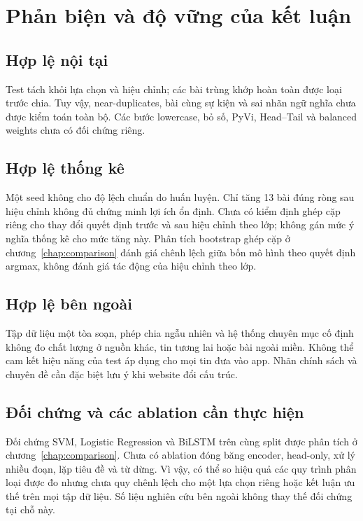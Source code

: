 \section{Phản biện và độ vững của kết luận}
\subsection{Hợp lệ nội tại}
Test tách khỏi lựa chọn và hiệu chỉnh; các bài trùng khớp hoàn toàn được loại trước chia. Tuy vậy, near-duplicates, bài cùng sự kiện và sai nhãn ngữ nghĩa chưa được kiểm toán toàn bộ. Các bước lowercase, bỏ số, PyVi, Head--Tail và balanced weights chưa có đối chứng riêng.
\subsection{Hợp lệ thống kê}
Một seed không cho độ lệch chuẩn do huấn luyện. Chỉ tăng 13 bài đúng ròng sau hiệu chỉnh không đủ chứng minh lợi ích ổn định. Chưa có kiểm định ghép cặp riêng cho thay đổi quyết định trước và sau hiệu chỉnh theo lớp; không gán mức ý nghĩa thống kê cho mức tăng này. Phân tích bootstrap ghép cặp ở chương~\ref{chap:comparison} đánh giá chênh lệch giữa bốn mô hình theo quyết định argmax, không đánh giá tác động của hiệu chỉnh theo lớp.
\subsection{Hợp lệ bên ngoài}
Tập dữ liệu một tòa soạn, phép chia ngẫu nhiên và hệ thống chuyên mục cố định không đo chất lượng ở nguồn khác, tin tương lai hoặc bài ngoài miền. Không thể cam kết hiệu năng của test áp dụng cho mọi tin đưa vào app. Nhãn chính sách và chuyên đề cần đặc biệt lưu ý khi website đổi cấu trúc.
\subsection{Đối chứng và các ablation cần thực hiện}
Đối chứng SVM, Logistic Regression và BiLSTM trên cùng split được phân tích ở chương~\ref{chap:comparison}. Chưa có ablation đóng băng encoder, head-only, xử lý nhiều đoạn, lặp tiêu đề và từ dừng. Vì vậy, có thể so hiệu quả các quy trình phân loại được đo nhưng chưa quy chênh lệch cho một lựa chọn riêng hoặc kết luận ưu thế trên mọi tập dữ liệu. Số liệu nghiên cứu bên ngoài không thay thế đối chứng tại chỗ này.
